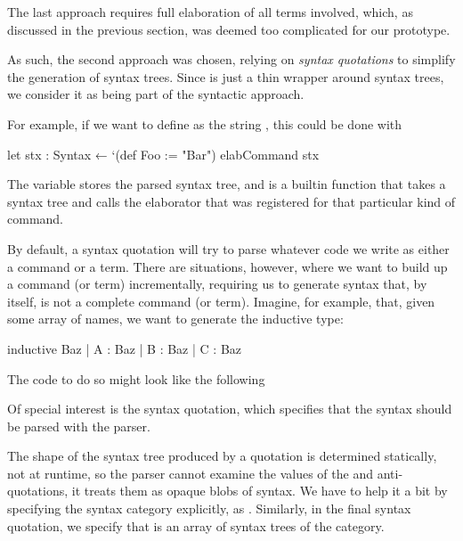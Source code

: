 The last approach requires full elaboration of all terms involved, which, as discussed in the previous section, was deemed too complicated for our prototype.

As such, the second approach was chosen, relying on \emph{syntax quotations} to simplify the generation of syntax trees.
Since  is just a thin wrapper around syntax trees, we consider it as being part of the syntactic approach.

For example, if we want to define  as the string , this could be done with
\begin{leancode}
    let stx : Syntax ← `(def Foo := "Bar")
    elabCommand stx
\end{leancode}
The variable  stores the parsed syntax tree, and  is a builtin function  that takes a  syntax tree and calls the elaborator that was registered for that particular kind of command.

By default, a syntax quotation will try to parse whatever code we write as either a command or a term. There are situations, however, where we want to build up a command (or term) incrementally, requiring us to generate syntax that, by itself, is not a complete command (or term). Imagine, for example, that, given some array \lean{[`A, `B, `C]} of names, we want to generate the inductive type:
\begin{leancode}
    inductive Baz
      | A : Baz
      | B : Baz
      | C : Baz
\end{leancode}
The code to do so might look like the following
Of special interest is the  syntax quotation, which specifies that the syntax should be parsed with the  parser. 

The shape of the syntax tree produced by a quotation is determined statically, not at runtime, so the parser cannot examine the values of the  and  anti-quotations, it treats them as opaque blobs of syntax. We have to help it a bit by specifying the syntax category explicitly, as .
Similarly, in the final \inductive{} syntax quotation, we specify that  is an array of syntax trees of the  category.

